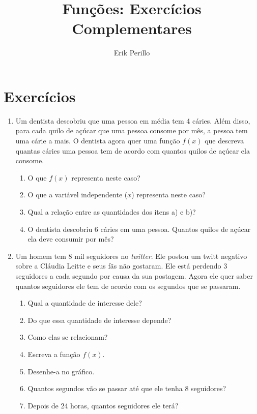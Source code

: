\documentclass[12pt]{article}
\begin{document}
\title{Funções: Exercícios Complementares}
\author{Erik Perillo}
\date{}
\maketitle

\newpage

\section{Exercícios}
\begin{enumerate}
	\item Um dentista descobriu que uma pessoa em média tem 4 cáries. 
		Além disso, para cada quilo de açúcar que uma pessoa consome por mês,
		a pessoa tem uma cárie a mais. O dentista agora quer uma função $f(x)$
		que descreva quantas cáries uma pessoa tem de acordo com quantos quilos
		de açúcar ela consome.
	\begin{enumerate}
		\item O que $f(x)$ representa neste caso?
		\item O que a variável independente ($x$) representa neste caso?
		\item Qual a relação entre as quantidades dos itens a) e b)?
		\item O dentista descobriu 6 cáries em uma pessoa. Quantos quilos de 
			açúcar ela deve consumir por mês?
	\end{enumerate}

	\item Um homem tem $8$ mil seguidores no \textit{twitter}. Ele postou 
		um twitt negativo sobre a Cláudia Leitte e seus fãs não gostaram. Ele
		está perdendo 3 seguidores a cada segundo por causa da sua postagem.
		Agora ele quer saber quantos seguidores ele tem de acordo com os 
		segundos que se passaram.
	\begin{enumerate}
		\item Qual a quantidade de interesse dele?
		\item Do que essa quantidade de interesse depende?
		\item Como elas se relacionam?
		\item Escreva a função $f(x)$.
		\item Desenhe-a no gráfico.
		\item Quantos segundos vão se passar até que ele tenha 8 seguidores?
		\item Depois de 24 horas, quantos seguidores ele terá?
	\end{enumerate}


\end{enumerate}
\end{document}
